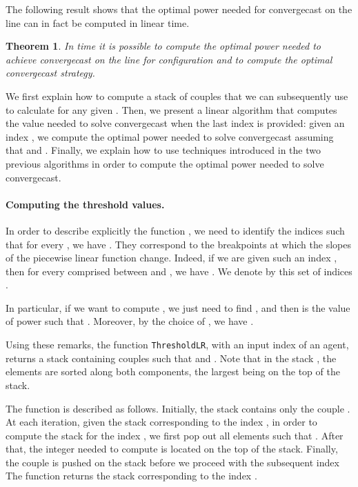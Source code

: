 \documentclass{article}
\newtheorem{theorem}{Theorem}
\newcommand\CompThLR{\mbox{{\tt ThresholdLR}}\xspace}
\newcommand\convergecast{convergecast\xspace}
\begin{document}
\medskip

The following result shows that the optimal power needed for convergecast on the line can in fact be computed in linear time.

\begin{theorem}\label{thm:OptPower}
In  time it is possible to compute  the optimal power needed to achieve
{\convergecast} on the line for configuration   and to compute the optimal convergecast strategy.
\end{theorem}

We first explain how to compute a stack of couples 
that we can subsequently use to calculate  for any
given .
Then, we present a linear algorithm that computes the value needed to
solve {\convergecast} when the last index  is provided:
given an index , we compute the optimal power needed to solve
{\convergecast} assuming that  and .
Finally, we explain how to use techniques introduced in the two
previous algorithms in order to compute the optimal power needed to
solve {\convergecast}. 

\paragraph{Computing the threshold values.}

In order to describe explicitly the function ,
we need to identify the indices  such that for every , we have . They correspond to the
breakpoints at which the slopes of the piecewise linear function
 change. Indeed, if we are given such an index
, then for every  comprised between  and , we have . We denote by
 this set of indices .

In particular, if we want to compute , we just need to
find ,
and then  is the value of power  such that
.  Moreover,
by the choice of , we have .

Using these remarks, the function \CompThLR, with an input index  of an agent, returns a stack  containing
couples  such that  and .  
Note that in the stack , the elements  are sorted
along both components, the largest being on the top of the stack.

The function is described as follows.  Initially, the stack
 contains only the couple .  At
each iteration, given the stack corresponding to the index , in
order to compute the stack for the index , we first pop out all
elements  such that . After that,
the integer  needed to compute  is located on the top
of the stack.  Finally, the couple  is pushed on
the stack before we proceed with the subsequent index 
 The function returns the stack  corresponding
to the index .
\end{document}

